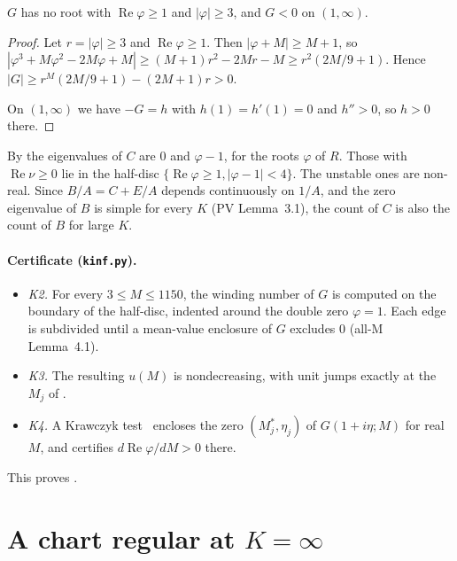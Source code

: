 \documentclass[11pt,a4paper]{report}
\begin{document}
\begin{lemma}\label{lem:roots}
\(G\) has no root with \(\operatorname{Re}\varphi\ge1\) and \(|\varphi|\ge3\), and \(G<0\) on \((1,\infty)\).
\end{lemma}
\begin{proof}
Let \(r=|\varphi|\ge3\) and \(\operatorname{Re}\varphi\ge1\). Then \(|\varphi+M|\ge M+1\), so
\(|\varphi^3+M\varphi^2-2M\varphi+M|\ge(M+1)r^2-2Mr-M\ge r^2(2M/9+1)\). Hence
\(|G|\ge r^M(2M/9+1)-(2M+1)r>0\).

On \((1,\infty)\) we have \(-G=h\) with \(h(1)=h'(1)=0\) and \(h''>0\), so \(h>0\) there.
\end{proof}

By  the eigenvalues of \(C\) are \(0\) and \(\varphi-1\), for the roots \(\varphi\) of \(R\).
Those with \(\operatorname{Re}\nu\ge0\) lie in the half-disc \(\{\operatorname{Re}\varphi\ge1,|\varphi-1|<4\}\). The
unstable ones are non-real. Since \(B/A=C+E/A\) depends continuously on \(1/A\), and the zero eigenvalue of \(B\) is
simple for every \(K\) (PV Lemma~3.1), the count of \(C\) is also the count of \(B\) for large \(K\).

\paragraph{Certificate (\texttt{kinf.py}).}
\begin{itemize}
\item \emph{K2.} For every \(3\le M\le1150\), the winding number of \(G\) is computed on the boundary of the half-disc,
indented around the double zero \(\varphi=1\). Each edge is subdivided until a mean-value enclosure of \(G\) excludes
\(0\) (all-M Lemma~4.1).
\item \emph{K3.} The resulting \(u(M)\) is nondecreasing, with unit jumps exactly at the \(M_j\) of .
\item \emph{K4.} A Krawczyk test~\autocite{Krawczyk1969,Moore1977} encloses the zero \((M^*_j,\eta_j)\) of
\(G(1+i\eta;M)\) for real \(M\), and certifies \(d\operatorname{Re}\varphi/dM>0\) there.
\end{itemize}
This proves .

\section{A chart regular at \texorpdfstring{\(K=\infty\)}{K = infinity}}
\end{document}
